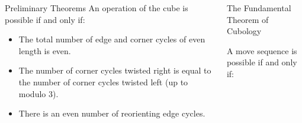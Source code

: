 \documentclass[final]{beamer}
\newlength{\colwidth}
\begin{document}
\begin{frame}[t]
\begin{columns}[t]
\begin{column}{\colwidth}
\begin{block}{Preliminary Theorems}
      An operation of the cube is possible if and only if:
            \begin{itemize}
              \item The total number of edge and corner cycles of even length is even.
              \item The number of corner cycles twisted right is equal to the number of corner cycles twisted left (up to modulo $3$).
              \item There is an even number of reorienting edge cycles.








    \end{itemize}

  \end{block}
  


\end{column}

\begin{column}{\colwidth}

  \begin{alertblock}{The Fundamental Theorem of Cubology}
    
    A move sequence is possible if and only if: 


\end{alertblock}
\end{column}
\end{columns}
\end{frame}
\end{document}
